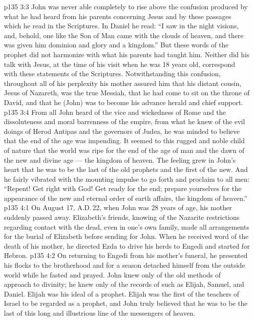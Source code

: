 \vs p135 3:3 \pc John was never able completely to rise above the confusion produced by what he had heard from his parents concerning Jesus and by these passages which he read in the Scriptures. In Daniel he read: “I saw in the night visions, and, behold, one like the Son of Man came with the clouds of heaven, and there was given him dominion and glory and a kingdom.” But these words of the prophet did not harmonize with what his parents had taught him. Neither did his talk with Jesus, at the time of his visit when he was 18 years old, correspond with these statements of the Scriptures. Notwithstanding this confusion, throughout all of his perplexity his mother assured him that his distant cousin, Jesus of Nazareth, was the true Messiah, that he had come to sit on the throne of David, and that he (John) was to become his advance herald and chief support.
\vs p135 3:4 From all John heard of the vice and wickedness of Rome and the dissoluteness and moral barrenness of the empire, from what he knew of the evil doings of Herod Antipas and the governors of Judea, he was minded to believe that the end of the age was impending. It seemed to this rugged and noble child of nature that the world was ripe for the end of the age of man and the dawn of the new and divine age --- the kingdom of heaven. The feeling grew in John’s heart that he was to be the last of the old prophets and the first of the new. And he fairly vibrated with the mounting impulse to go forth and proclaim to all men: “Repent! Get right with God! Get ready for the end; prepare yourselves for the appearance of the new and eternal order of earth affairs, the kingdom of heaven.”
\vs p135 4:1 On August 17, A.D.\,22, when John was 28 years of age, his mother suddenly passed away. Elizabeth’s friends, knowing of the Nazarite restrictions regarding contact with the dead, even in one’s own family, made all arrangements for the burial of Elizabeth before sending for John. When he received word of the death of his mother, he directed Ezda to drive his herds to Engedi and started for Hebron.
\vs p135 4:2 On returning to Engedi from his mother’s funeral, he presented his flocks to the brotherhood and for a season detached himself from the outside world while he fasted and prayed. John knew only of the old methods of approach to divinity; he knew only of the records of such as Elijah, Samuel, and Daniel. Elijah was his ideal of a prophet. Elijah was the first of the teachers of Israel to be regarded as a prophet, and John truly believed that he was to be the last of this long and illustrious line of the messengers of heaven.
